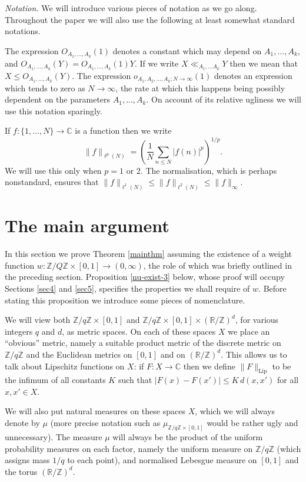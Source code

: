 \documentclass[10pt,reqno]{amsart}
\theoremstyle{definition}
\theoremstyle{remark}
\renewcommand{\leq}{\leqslant}
\newcommand\Lip{\operatorname{Lip}}
\def\R{\mathbb{R}}
\def\C{\mathbb{C}}
\def\Z{\mathbb{Z}}
\numberwithin{equation}{section}
\begin{document}
\emph{Notation.} We will introduce various pieces of notation as we go along. Throughout the paper we will also use the following at least somewhat standard notations.

The expression $O_{A_1,\dots, A_k}(1)$ denotes a constant which may depend on $A_1,\dots, A_k$, and $O_{A_1,\dots, A_k}(Y) = O_{A_1,\dots, A_k}(1)Y$. If we write $X \ll_{A_1,\dots A_k} Y$ then we mean that $X \leq O_{A_1,\dots, A_k}(Y)$. The expression $o_{A_1,A_2,\dots, A_k; N \rightarrow \infty}(1)$ denotes an expression which tends to zero as $N \rightarrow \infty$, the rate at which this happens being possibly dependent on the parameters $A_1,\dots, A_k$. On account of its relative ugliness we will use this notation sparingly.

If $f : \{1,\dots,N\} \to \C$ is a function then we write \[\|f\|_{\ell^p(N)} = \left( \frac{1}{N} \sum_{n \leq N} |f(n)|^p \right)^{1/p}.\] We will use this only when $p = 1$ or $2$. The normalisation, which is perhaps nonstandard, ensures that $\|f\|_{\ell^{1}(N)} \leq \|f\|_{\ell^2(N)} \leq \|f\|_{\infty}$.

\section{The main argument}
\label{sec3}

In this section we prove Theorem \ref{mainthm} assuming the existence of a weight function $w : \Z/Q\Z \times [0,1] \rightarrow (0,\infty)$, the role of which was briefly outlined in the preceding section. Proposition \ref{nu-exist-3} below, whose proof will occupy Sections \ref{sec4} and \ref{sec5}, specifies the properties we shall require of $w$. Before stating this proposition we introduce some pieces of nomenclature. 

We will view both $\Z/q\Z \times [0,1]$ and $\Z/q\Z \times [0,1] \times (\R/\Z)^d$, for various integers $q$ and $d$, as metric spaces. On each of these spaces $X$ we place an ``obvious'' metric, namely a suitable product metric of the discrete metric on $\Z/q\Z$ and the Euclidean metrics on $[0,1]$ and on $(\R/\Z)^d$. This allows us to talk about Lipschitz functions on $X$: if $F : X \rightarrow \C$ then we define $\|F\|_{\Lip}$ to be the infimum of all constants $K$ such that $|F(x) - F(x')| \leq K\, d(x,x')$ for all $x, x' \in X$.

We will also put natural measures on these spaces $X$, which we will always denote by $\mu$ (more precise notation such as $\mu_{\Z/q\Z \times [0,1]}$ would be rather ugly and unnecessary). The measure $\mu$ will always be the product of the uniform probability measures on each factor, namely the uniform measure on $\Z/q\Z$ (which assigns mass $1/q$ to each point), and normalised Lebesgue measure on $[0,1]$ and the torus $(\R/\Z)^d$. 
\end{document}
